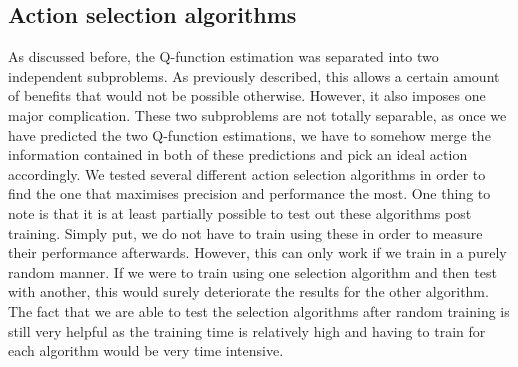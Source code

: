 \subsection{Action selection algorithms}
As discussed before, the Q-function estimation was separated into two independent subproblems. As previously described, this allows a certain amount of benefits that would not be possible otherwise. However, it also imposes one major complication. These two subproblems are not totally separable, as once we have predicted the two Q-function estimations, we have to somehow merge the information contained in both of these predictions and pick an ideal action accordingly. We tested several different action selection algorithms in order to find the one that maximises precision and performance the most. One thing to note is that it is at least partially possible to test out these algorithms post training. Simply put, we do not have to train using these in order to measure their performance afterwards. However, this can only work if we train in a purely random manner. If we were to train using one selection algorithm and then test with another, this would surely deteriorate the results for the other algorithm. The fact that we are able to test the selection algorithms after random training is still very helpful as the training time is relatively high and having to train for each algorithm would be very time intensive.
